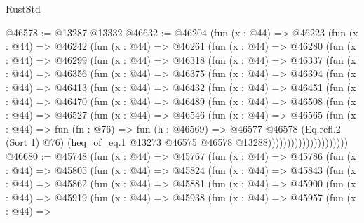 \begin{lexlean}{RustStd}
\begin{coremodule}
@46578 := @13287 @13332
@46632 := @46204
    (fun (x : @44) =>
    @46223
      (fun (x : @44) =>
      @46242
        (fun (x : @44) =>
        @46261
          (fun (x : @44) =>
          @46280
            (fun (x : @44) =>
            @46299
              (fun (x : @44) =>
              @46318
                (fun (x : @44) =>
                @46337
                  (fun (x : @44) =>
                  @46356
                    (fun (x : @44) =>
                    @46375
                      (fun (x : @44) =>
                      @46394
                        (fun (x : @44) =>
                        @46413
                          (fun (x : @44) =>
                          @46432
                            (fun (x : @44) =>
                            @46451
                              (fun (x : @44) =>
                              @46470
                                (fun (x : @44) =>
                                @46489
                                  (fun (x : @44) =>
                                  @46508
                                    (fun (x : @44) =>
                                    @46527
                                      (fun (x : @44) =>
                                      @46546
                                        (fun (x : @44) =>
                                        @46565
                                          (fun (x : @44) =>
                                          fun (fn : @76) =>
                                          fun (h : @46569) =>
                                          @46577
                                            @46578
                                            (Eq.refl.{2} (Sort 1) @76)
                                            (heq_of_eq.{1}
                                              @13273
                                              @46575
                                              @46578
                                              @13288)))))))))))))))))))))
@46680 := @45748
    (fun (x : @44) =>
    @45767
      (fun (x : @44) =>
      @45786
        (fun (x : @44) =>
        @45805
          (fun (x : @44) =>
          @45824
            (fun (x : @44) =>
            @45843
              (fun (x : @44) =>
              @45862
                (fun (x : @44) =>
                @45881
                  (fun (x : @44) =>
                  @45900
                    (fun (x : @44) =>
                    @45919
                      (fun (x : @44) =>
                      @45938
                        (fun (x : @44) =>
                        @45957
                          (fun (x : @44) =>

\end{coremodule}
\end{lexlean}
